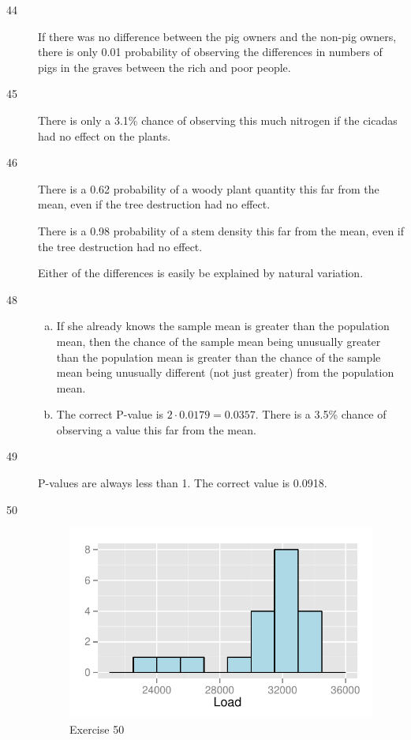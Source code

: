 \documentclass[letterpaper, landscape]{exam}
\begin{document}
\begin{description}
      \item[44] If there was no difference between the pig owners and the
        non-pig owners, there is only 0.01 probability of observing the
        differences in numbers of pigs in the graves between the rich and poor
        people.

      \item[45] There is only a 3.1\% chance of observing this much nitrogen if
        the cicadas had no effect on the plants.

      \item[46] There is a 0.62 probability of a woody plant quantity this far
        from the mean, even if the tree destruction had no effect.

        There is a 0.98 probability of a stem density this far from the mean, even
        if the tree destruction had no effect.

        Either of the differences is easily be explained by natural variation.

      \item[48] 
        \begin{enumerate}[(a)]
          \item If she already knows the sample mean is greater than the
            population mean, then the chance of the sample mean being unusually
            greater than the population mean is greater than the chance of the
            sample mean being unusually different (not just greater) from the
            population mean.

          \item The correct P-value is $2 \cdot 0.0179 = 0.0357$. There is a
            3.5\% chance of observing a value this far from the mean.

        \end{enumerate}

      \item[49] P-values are always less than 1. The correct value is 0.0918.

      \item[50]
        \begin{figure}[H]
          \centering
          \includegraphics{ex50.pdf}
          \caption{Exercise 50}
          \label{fig:ex50}
        \end{figure}


\end{description}
\end{document}
